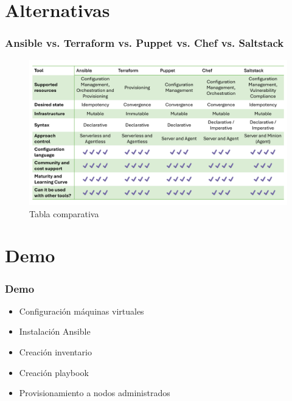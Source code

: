 \documentclass[
	11pt, %
]{beamer}
\begin{document}
\section{Alternativas}

\begin{frame}
	\frametitle{Ansible vs. Terraform vs. Puppet vs. Chef vs. Saltstack}

	\begin{figure}
		\includegraphics[width=0.9\linewidth]{alternativaTabla.pdf}
		\caption{Tabla comparativa \href{https://coralogix.com/blog/the-definitive-guide-to-configuration-management-tools/}{\cite{p5}}}
	\end{figure}

\end{frame}


\section{Demo}

\begin{frame}
	\frametitle{Demo}
	\begin{itemize}
		\item Configuración máquinas virtuales
		\item Instalación Ansible
		\item Creación inventario
		\item Creación playbook
		\item Provisionamiento a nodos administrados
	\end{itemize}

\end{frame}

\end{document}
